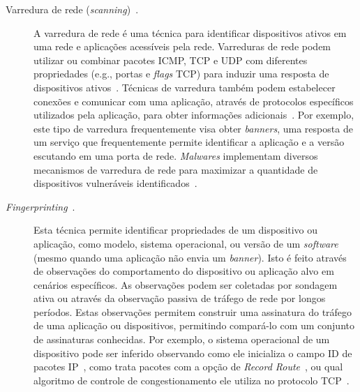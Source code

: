 \begin{description}

  \item[Varredura de rede (\emph{scanning})~\cite{bhuyan2011surveying, barnett2008towards, wen2015novel, de1999review}.] A varredura de rede é uma técnica para identificar dispositivos ativos em uma rede e aplicações acessíveis pela rede. Varreduras de rede podem utilizar ou combinar pacotes ICMP, TCP e UDP com diferentes propriedades (e.g., portas e \emph{flags} TCP) para induzir uma resposta de dispositivos ativos~\cite{abu2006multifaceted,durumeric2013zmap}. Técnicas de varredura também podem estabelecer conexões e comunicar com uma aplicação, através de protocolos específicos utilizados pela aplicação, para obter informações adicionais~\cite{bajpai2018art,durumeric2015search}. Por exemplo, este tipo de varredura frequentemente visa obter \emph{banners}, uma resposta de um serviço que frequentemente permite identificar a aplicação e a versão escutando em uma porta de rede. \emph{Malwares} implementam diversos mecanismos de varredura de rede para maximizar a quantidade de dispositivos vulneráveis identificados~\cite{abu2006multifaceted, antonakakis17mirai, marzano18botnets}.

  \item[\emph{Fingerprinting}~\cite{bifulco2015fingerprinting, owens11fingerprint, shaikh2008network, shamsi2015hershel, shamsi2021faulds}.]  Esta técnica permite identificar propriedades de um dispositivo ou aplicação, como modelo, sistema operacional, ou versão de um \emph{software} (mesmo quando uma aplicação não envia um \emph{banner}). Isto é feito através de observações do comportamento do dispositivo ou aplicação alvo em cenários específicos. As observações podem ser coletadas por sondagem ativa ou através da observação passiva de tráfego de rede por longos períodos.
  Estas observações permitem construir uma assinatura do tráfego de uma aplicação ou dispositivos, permitindo compará-lo com um conjunto de assinaturas conhecidas. Por exemplo, o sistema operacional de um dispositivo pode ser inferido observando como ele inicializa o campo ID de pacotes IP~\cite{kohno2005remote}, como trata pacotes com a opção de \emph{Record Route}~\cite{sherwood08discarte}, ou qual algoritmo de controle de congestionamento ele utiliza no protocolo TCP~\cite{beverly2004robust}.


\end{description}

